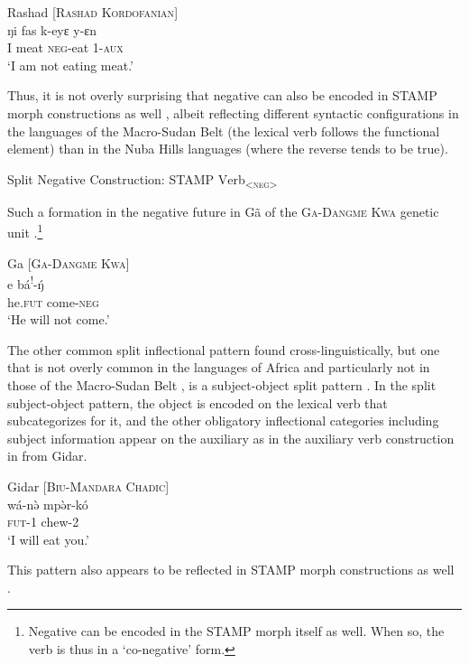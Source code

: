 \documentclass[output=paper]{langsci/langscibook}
\begin{document}
\ea\label{ex:anderson:26}
Rashad \citep[297]{TuckerBryan1966}      [\textsc{Rashad Kordofanian}]\\
\gll ŋi   fas    k-eyɛ    y-ɛn\\
I  meat    \textsc{neg}-eat  1-\textsc{aux}\\
\glt `I am not eating meat.'
\z

Thus, it is not overly surprising that negative can also be encoded in STAMP morph constructions as well , albeit reflecting different syntactic configurations in the languages of the Macro-Sudan Belt (the lexical verb follows the functional element) than in the Nuba Hills languages (where the reverse tends to be true).

\ea\label{ex:anderson:27}
Split Negative Construction:  \textsc{STAMP  V}erb\textsc{\textsubscript{<neg>}}
\z

Such a formation in the negative future in Gã of the \textsc{Ga-Dangme Kwa} genetic unit .\footnote{Negative can be encoded in the STAMP morph itself as well. When so, the verb is thus in a `co-negative' form.}

\ea\label{ex:anderson:28}
Ga \citep[105]{Kropp1988}        [\textsc{Ga-Dangme Kwa}]\\
\gll e\textsuperscript{{\textbar}}    bá\textsuperscript{!}-\'{ŋ}\\
he\textsc{.fut}  come-\textsc{neg}\\
\glt `He will not come.'
\z

The other common split inflectional pattern found cross-linguistically, but one that is not overly common in the languages of Africa and particularly not in those of the Macro-Sudan Belt \citep{Anderson2011}, is a subject-object split pattern \citep{Anderson2006}. In the split subject-object pattern, the object is encoded on the lexical verb that subcategorizes for it, and the other obligatory inflectional categories including subject information appear on the auxiliary as in the auxiliary verb construction in  from Gidar.

\ea\label{ex:anderson:29}
Gidar \citep[263]{Frajzyngier2008}        \textsc{[Biu-Mandara Chadic]}\\
\gll wá-n\`{ə}    mp\`{ə}r-kó\\
\textsc{fut}-1    chew-2\\
\glt `I will eat you.'
\z

This pattern also appears to be reflected in STAMP morph constructions as well . 
\end{document}
